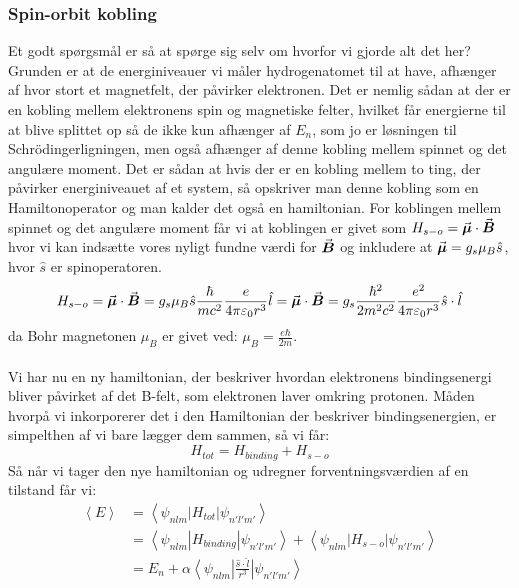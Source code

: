 \documentclass[../../Atom-ogMolekylefysik.tex]{subfiles}
\begin{document}
\subsubsection*{Spin-orbit kobling}
Et godt spørgsmål er så at spørge sig selv om hvorfor vi gjorde alt det her? Grunden er at de energiniveauer vi måler hydrogenatomet til at have, afhænger af hvor stort et magnetfelt, der påvirker elektronen. Det er nemlig sådan at der er en kobling mellem elektronens spin og magnetiske felter, hvilket får energierne til at blive splittet op så de ikke kun afhænger af $E_n$, som jo er løsningen til Schrödingerligningen, men også afhænger af denne kobling mellem spinnet og det angulære moment. Det er sådan at hvis der er en kobling mellem to ting, der påvirker energiniveauet af et system, så opskriver man denne kobling som en Hamiltonoperator og man kalder det også en hamiltonian. For koblingen mellem spinnet og det angulære moment får vi at koblingen er givet som $H_{s-o}={\vec{\boldsymbol{\mu}}}\cdot{\vec{\boldsymbol{B}}}$ hvor vi kan indsætte vores nyligt fundne værdi for ${\vec{\boldsymbol{B}}}$ og inkludere at ${\vec{\boldsymbol{\mu}}}=g_s\mu_B\hat{s}$, hvor $\hat{s}$ er spinoperatoren.
\begin{equation}
    H_{s-o}={\vec{\boldsymbol{\mu}}}\cdot{\vec{\boldsymbol{B}}}=g_s\mu_B\hat{s}\frac{\hbar}{mc^2}\frac{e}{4\pi\varepsilon_0r^3}\hat{l}={\vec{\boldsymbol{\mu}}}\cdot{\vec{\boldsymbol{B}}}=g_s\frac{\hbar^2}{2m^2c^2}\frac{e^2}{4\pi\varepsilon_0r^3}\hat{s}\cdot\hat{l}
\end{equation}
da Bohr magnetonen $\mu_B$ er givet ved: $\mu_B=\frac{e\hbar}{2m}$.\\
\\
Vi har nu en ny hamiltonian, der beskriver hvordan elektronens bindingsenergi bliver påvirket af det B-felt, som elektronen laver omkring protonen. Måden hvorpå vi inkorporerer det i den Hamiltonian der beskriver bindingsenergien, er simpelthen af vi bare lægger dem sammen, så vi får:
\begin{equation}
    H_{tot}=H_{binding}+H_{s-o}
\end{equation}
Så når vi tager den nye hamiltonian og udregner forventningsværdien af en tilstand får vi:
\begin{align*}
    \left<E\right>&=\left<\psi_{nlm}|H_{tot}|\psi_{n'l'm'}\right>\\
    &=\left<\psi_{nlm}|H_{binding}|\psi_{n'l'm'}\right>+\left<\psi_{nlm}|H_{s-o}|\psi_{n'l'm'}\right>\\
    &=E_{n}+\alpha\left<\psi_{nlm}\right|\frac{\hat{s}\cdot\hat{l}}{r^3}\left|\psi_{n'l'm'}\right>
\end{align*}
\end{document}
